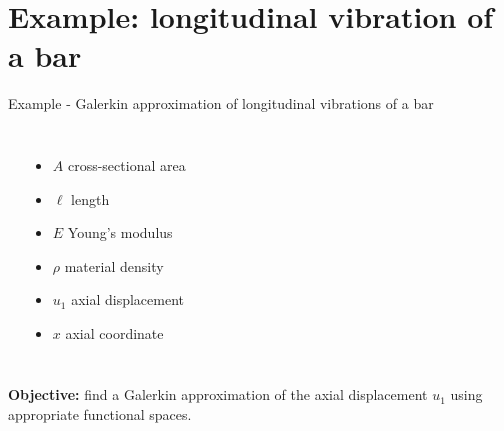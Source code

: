 \documentclass[aspectratio=169]{beamer}
\begin{document}
\section{Example: longitudinal vibration of a bar}

\begin{frame}{Example - Galerkin approximation of longitudinal vibrations of a bar}
  \begin{columns}
    \begin{center}
    \end{center}

    {\small \begin{itemize}
        \item $A$ cross-sectional area
        \item $\ell$ length
        \item $E$ Young's modulus
        \item $\rho$ material density
        \item $u_1$ axial displacement
        \item $x$ axial coordinate
      \end{itemize}}

  \end{columns}

  \vspace{0.5cm}
  \begin{block}{}
    \textbf{Objective:} find a Galerkin approximation of the axial displacement $u_{1}$ using appropriate functional spaces.
  \end{block}
\end{frame}
\end{document}
